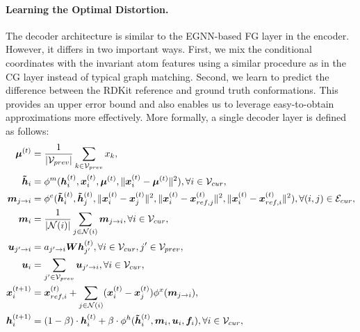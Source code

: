 \vspace{-1ex}
\paragraph{Learning the Optimal Distortion.}The decoder architecture is similar to the EGNN-based FG layer in the encoder. However, it differs in two important ways. First, we mix the conditional coordinates with the invariant atom features using a similar procedure as in the CG layer instead of typical graph matching. Second, we learn to predict the difference between the RDKit reference and ground truth conformations. This provides an upper error bound and also enables us to leverage easy-to-obtain approximations more effectively.
More formally, a single decoder layer is defined as follows:
\begin{subequations}
\begin{align}
\bm{\mu}^{(t)} &= \frac{1}{|{\mathcal{V}}_{prev}|} \sum_{k\in {\mathcal{V}}_{prev}}x_k, \\
\bm{\Tilde{h}}_{i} &= \phi^m(\bm{h}_i^{(t)},\bm{x}_i^{(t)},\bm{\mu}^{(t)},\lVert\bm{x}_i^{(t)}-\bm{\mu}^{(t)}\rVert^2),\forall i \in {\mathcal{V}}_{cur}, \\
\bm{m}_{j\to i} &= \phi^e(\bm{\Tilde{h}}_i^{(t)},\bm{\Tilde{h}}_j^{(t)},\lVert\bm{x}_i^{(t)}-\bm{x}_j^{(t)}\rVert^2,\lVert\bm{x}_i^{(t)}-\bm{x}_{ref, j}^{(t)}\rVert^2, \lVert\bm{x}_i^{(t)}-\bm{x}_{ref, i}^{(t)}\rVert^2),\forall (i,j)\in {\mathcal{E}}_{cur}, \\
\bm{m}_i &= \frac{1}{|{\mathcal{N}}(i)|} \sum_{j\in{\mathcal{N}}(i)}\bm{m}_{j\to i},\forall i\in{\mathcal{V}}_{cur}, \\
\bm{u}_{j'\to i} &= a_{j'\to i} \bm{W} \bm{h}_{j'}^{(t)},\forall i\in{\mathcal{V}}_{cur},j'\in{\mathcal{V}}_{prev}, \\
\bm{u}_{i} &=  \sum_{j'\in{\mathcal{V}}_{prev}}\bm{u}_{j'\to i},\forall i \in{\mathcal{V}}_{cur},\\
\bm{x}_i^{(t+1)} &= \bm{x}_{ref,i}^{(t)} + \sum_{j\in{\mathcal{N}}(i)} (\bm{x}_i^{(t)}-\bm{x}_j^{(t)})\phi^x(\bm{m}_{j\to i}), \\
\bm{h}_i^{(t+1)} &= (1 - \beta) \cdot \bm{h}_i^{(t)} + \beta \cdot \phi^h(\bm{\Tilde{h}}_i^{(t)},\bm{m}_i,\bm{u}_{i}, \bm{f}_i),\forall i\in{\mathcal{V}}_{cur},
\end{align}
\label{eqn:decoder}
\end{subequations}
